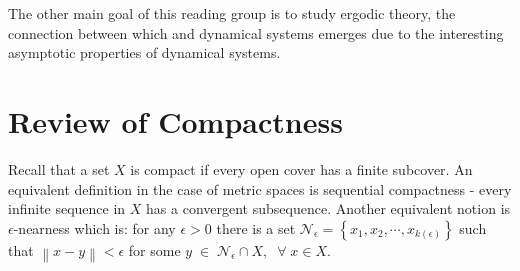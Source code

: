 \documentclass[11pt]{article}
\newcommand{\norm}[1]{\left\lVert#1\right\rVert}
\begin{document}
The other main goal of this reading group is to study ergodic theory, the connection between 
which and dynamical systems emerges due to the interesting asymptotic
properties of dynamical systems. 


\section*{Review of Compactness}

Recall that a set $X$ is compact if every open cover has a finite subcover. An equivalent
definition in the case of metric spaces is sequential compactness - every 
infinite sequence in $X$ has a convergent subsequence. Another equivalent
notion is $\epsilon$-nearness which is: for any 
$\epsilon > 0$ there 
is a set $\mathcal{N}_\epsilon = \left\{ x_1, x_2, \cdots, x_{k(\epsilon)}  \right\}$ such that $\norm{x-y} < \epsilon$ for some $y \;\in\; \mathcal{N}_\epsilon\cap X,\;\;\forall\;x \in X$.  



\end{document}
